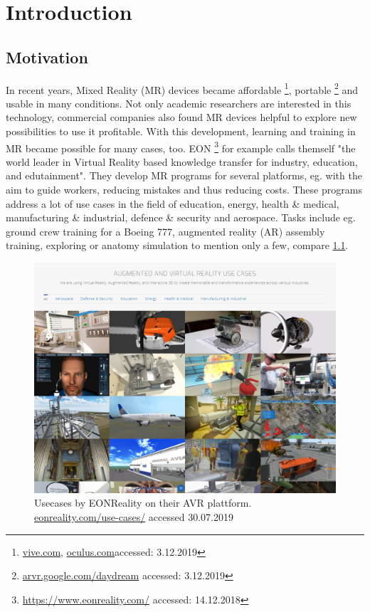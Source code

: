 \chapter{Introduction}

\section{Motivation}
In recent years, Mixed Reality (MR) devices became affordable \footnote{\hyperlink{https://www.vive.com/}{vive.com}, \hyperlink{https://www.oculus.com/}{oculus.com}accessed: 3.12.2019}, portable \footnote{\hyperlink{https://arvr.google.com/daydream/}{arvr.google.com/daydream} accessed: 3.12.2019} and usable in many conditions. Not only academic researchers are interested in this technology, commercial companies also found MR devices helpful to explore new possibilities to use it profitable. With this development, learning and training in MR became possible for many cases, too. EON \footnote{\hyperlink{https://www.eonreality.com/}{https://www.eonreality.com/} accessed: 14.12.2018} for example calls themself "the world leader in Virtual Reality based knowledge transfer for industry, education, and edutainment". They develop MR programs for several platforms, eg. with the aim to guide workers, reducing mistakes and thus reducing costs. These programs address a lot of use cases in the field of education, energy, health \& medical, manufacturing \& industrial, defence \& security and aerospace. Tasks include eg. ground crew training for a Boeing 777, augmented reality (AR) assembly training, exploring or anatomy simulation to mention only a few, compare \ref{fig:eonreality}.
\begin{figure}
	\centering
	\includegraphics[width=1.0\textwidth]{img/eonreality.PNG}
	\caption{Usecases by EONReality on their AVR plattform.  \hyperlink{https://www.eonreality.com/use-cases/}{eonreality.com/use-cases/} accessed 30.07.2019}
	\label{fig:eonreality}
\end{figure}
